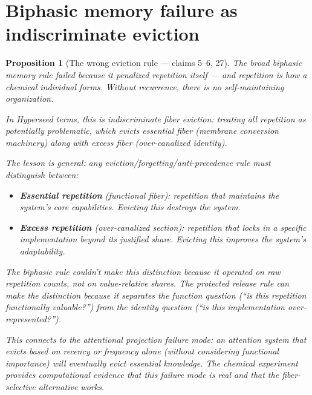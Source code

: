 \documentclass[11pt,a4paper]{article}
\newtheorem{proposition}[definition]{Proposition}
\begin{document}
\section{Biphasic memory failure as indiscriminate eviction}
\label{sec:failure}

\begin{proposition}[The wrong eviction rule --- claims 5--6, 27]
\label{prop:failure}
The broad biphasic memory rule failed because it penalized repetition
itself --- and repetition is how a chemical individual forms. Without
recurrence, there is no self-maintaining organization.

In Hyperseed terms, this is \emph{indiscriminate fiber eviction}:
treating all repetition as potentially problematic, which evicts
essential fiber (membrane conversion machinery) along with excess
fiber (over-canalized identity).

The lesson is general: any eviction/forgetting/anti-precedence rule
must distinguish between:
\begin{itemize}
\item \textbf{Essential repetition} (functional fiber): repetition
  that maintains the system's core capabilities. Evicting this
  destroys the system.
\item \textbf{Excess repetition} (over-canalized section): repetition
  that locks in a specific implementation beyond its justified share.
  Evicting this improves the system's adaptability.
\end{itemize}

The biphasic rule couldn't make this distinction because it operated
on raw repetition counts, not on value-relative shares. The protected
release rule can make the distinction because it separates the
\emph{function} question (``is this repetition functionally valuable?'')
from the \emph{identity} question (``is this implementation
over-represented?'').

This connects to the attentional projection failure mode: an attention
system that evicts based on recency or frequency alone (without
considering functional importance) will eventually evict essential
knowledge. The chemical experiment provides computational evidence
that this failure mode is real and that the fiber-selective alternative
works.
\end{proposition}

\end{document}
